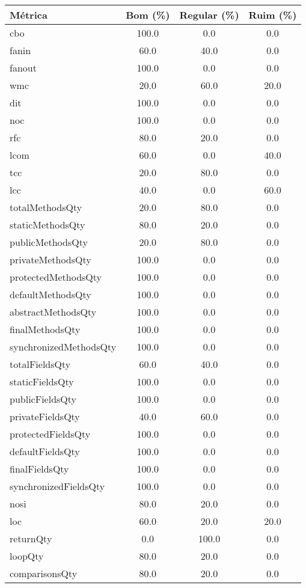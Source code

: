 \begin{tabular}{lccc}
                \toprule
                \textbf{Métrica} & \textbf{Bom (\%)} & \textbf{Regular (\%)} & \textbf{Ruim (\%)} \\
                \midrule
                cbo & 100.0 & 0.0 & 0.0 \\
fanin & 60.0 & 40.0 & 0.0 \\
fanout & 100.0 & 0.0 & 0.0 \\
wmc & 20.0 & 60.0 & 20.0 \\
dit & 100.0 & 0.0 & 0.0 \\
noc & 100.0 & 0.0 & 0.0 \\
rfc & 80.0 & 20.0 & 0.0 \\
lcom & 60.0 & 0.0 & 40.0 \\
tcc & 20.0 & 80.0 & 0.0 \\
lcc & 40.0 & 0.0 & 60.0 \\
totalMethodsQty & 20.0 & 80.0 & 0.0 \\
staticMethodsQty & 80.0 & 20.0 & 0.0 \\
publicMethodsQty & 20.0 & 80.0 & 0.0 \\
privateMethodsQty & 100.0 & 0.0 & 0.0 \\
protectedMethodsQty & 100.0 & 0.0 & 0.0 \\
defaultMethodsQty & 100.0 & 0.0 & 0.0 \\
abstractMethodsQty & 100.0 & 0.0 & 0.0 \\
finalMethodsQty & 100.0 & 0.0 & 0.0 \\
synchronizedMethodsQty & 100.0 & 0.0 & 0.0 \\
totalFieldsQty & 60.0 & 40.0 & 0.0 \\
staticFieldsQty & 100.0 & 0.0 & 0.0 \\
publicFieldsQty & 100.0 & 0.0 & 0.0 \\
privateFieldsQty & 40.0 & 60.0 & 0.0 \\
protectedFieldsQty & 100.0 & 0.0 & 0.0 \\
defaultFieldsQty & 100.0 & 0.0 & 0.0 \\
finalFieldsQty & 100.0 & 0.0 & 0.0 \\
synchronizedFieldsQty & 100.0 & 0.0 & 0.0 \\
nosi & 80.0 & 20.0 & 0.0 \\
loc & 60.0 & 20.0 & 20.0 \\
returnQty & 0.0 & 100.0 & 0.0 \\
loopQty & 80.0 & 20.0 & 0.0 \\
comparisonsQty & 80.0 & 20.0 & 0.0 \\

\end{tabular}
